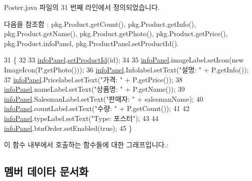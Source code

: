 Poster.\+java 파일의 31 번째 라인에서 정의되었습니다.



다음을 참조함 \+:  pkg.\+Product.\+get\+Count(), pkg.\+Product.\+get\+Info(), pkg.\+Product.\+get\+Name(), pkg.\+Product.\+get\+Photo(), pkg.\+Product.\+get\+Price(), pkg.\+Product.\+info\+Panel, pkg.\+Product\+Panel.\+set\+Product\+Id().


\begin{DoxyCode}
31                                                                 \{
32         
33         \hyperlink{classpkg_1_1_product_a6755de182d9383bc860fa44a8a01789d}{infoPanel}.\hyperlink{classpkg_1_1_product_panel_ae1cb96da7cd48c10f53c8c9f8e44d4d3}{setProductId}(\textcolor{keywordtype}{id});
34         
35         \hyperlink{classpkg_1_1_product_a6755de182d9383bc860fa44a8a01789d}{infoPanel}.imageLabel.setIcon(\textcolor{keyword}{new} ImageIcon(P.getPhoto()));
36         \hyperlink{classpkg_1_1_product_a6755de182d9383bc860fa44a8a01789d}{infoPanel}.Infolabel.setText(\textcolor{stringliteral}{"설명: "} + P.getInfo());
37         \hyperlink{classpkg_1_1_product_a6755de182d9383bc860fa44a8a01789d}{infoPanel}.Pricelabel.setText(\textcolor{stringliteral}{"가격: "} + P.getPrice());
38         \hyperlink{classpkg_1_1_product_a6755de182d9383bc860fa44a8a01789d}{infoPanel}.nameLabel.setText(\textcolor{stringliteral}{"상품명: "} + P.getName());
39         \hyperlink{classpkg_1_1_product_a6755de182d9383bc860fa44a8a01789d}{infoPanel}.SalesmanLabel.setText(\textcolor{stringliteral}{"판매자: "} + salesmanName);
40         \hyperlink{classpkg_1_1_product_a6755de182d9383bc860fa44a8a01789d}{infoPanel}.countLabel.setText(\textcolor{stringliteral}{"수량: "} + P.getCount());
41         
42         \hyperlink{classpkg_1_1_product_a6755de182d9383bc860fa44a8a01789d}{infoPanel}.typeLabel.setText(\textcolor{stringliteral}{"Type: 포스터"});
43         
44         \hyperlink{classpkg_1_1_product_a6755de182d9383bc860fa44a8a01789d}{infoPanel}.btnOrder.setEnabled(\textcolor{keyword}{true});
45     \}
\end{DoxyCode}


이 함수 내부에서 호출하는 함수들에 대한 그래프입니다.\+:




\subsection{멤버 데이타 문서화}
